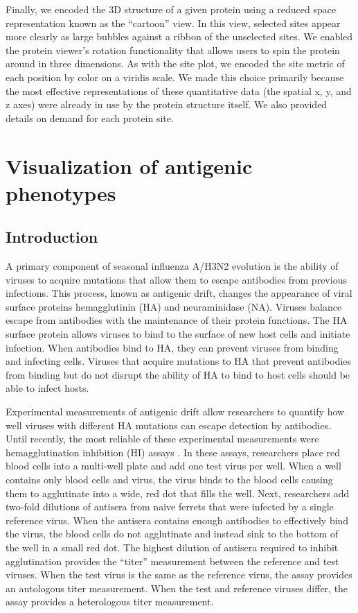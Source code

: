 Finally, we encoded the 3D structure of a given protein using a reduced space representation known as the ``cartoon'' view.
In this view, selected sites appear more clearly as large bubbles against a ribbon of the unselected sites.
We enabled the protein viewer's rotation functionality that allows users to spin the protein around in three dimensions.
As with the site plot, we encoded the site metric of each position by color on a viridis scale.
We made this choice primarily because the most effective representations of these quantitative data (the spatial x, y, and z axes) were already in use by the protein structure itself.
We also provided details on demand for each protein site.

\section{Visualization of antigenic phenotypes}

\subsection{Introduction}

A primary component of seasonal influenza A/H3N2 evolution is the ability of viruses to acquire mutations that allow them to escape antibodies from previous infections.
This process, known as antigenic drift, changes the appearance of viral surface proteins hemagglutinin (HA) and neuraminidase (NA).
Viruses balance escape from antibodies with the maintenance of their protein functions.
The HA surface protein allows viruses to bind to the surface of new host cells and initiate infection.
When antibodies bind to HA, they can prevent viruses from binding and infecting cells.
Viruses that acquire mutations to HA that prevent antibodies from binding but do not disrupt the ability of HA to bind to host cells should be able to infect hosts.

Experimental measurements of antigenic drift allow researchers to quantify how well viruses with different HA mutations can escape detection by antibodies.
Until recently, the most reliable of these experimental measurements were hemagglutination inhibition (HI) assays \citep{hirst1943studies}.
In these assays, researchers place red blood cells into a multi-well plate and add one test virus per well.
When a well contains only blood cells and virus, the virus binds to the blood cells causing them to agglutinate into a wide, red dot that fills the well.
Next, researchers add two-fold dilutions of antisera from naive ferrets that were infected by a single reference virus.
When the antisera contains enough antibodies to effectively bind the virus, the blood cells do not agglutinate and instead sink to the bottom of the well in a small red dot.
The highest dilution of antisera required to inhibit agglutination provides the ``titer'' measurement between the reference and test viruses.
When the test virus is the same as the reference virus, the assay provides an autologous titer measurement.
When the test and reference viruses differ, the assay provides a heterologous titer measurement.

